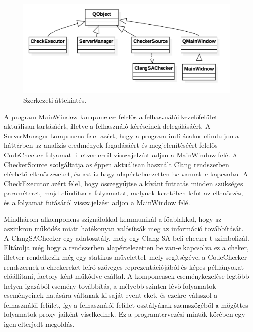\documentclass[a4paper,12pt]{report}
\begin{document}
\begin{figure}[h]
\caption{Szerkezeti áttekintés.}
\centering
\includegraphics[scale=0.3]{UMLattekintes.png}
\end{figure}

A program MainWindow komponense felelős a felhasználói kezelőfelület aktuálisan tartásáért, illetve a felhasználó kéréseinek delegálásáért. A ServerManager komponens felel azért, hogy a program indításakor elinduljon a háttérben az analízis-eredmények fogadásáért és megjelenítéséért felelős CodeChecker folyamat, illetver erről visszajelzést adjon a MainWindow felé. A CheckerSource szolgáltatja az éppen aktuálisan használt Clang rendszerben elérhető ellenőrzéseket, és azt is hogy alapértelmezetten be vannak-e kapcsolva. A CheckExecutor azért felel, hogy összegyűjtse a kívánt futtatás minden szükséges paraméterét, majd elindítsa a folyamatot, melynek keretében lefut az ellenőrzés, és a folyamat futásáról visszajelzést adjon a MainWindow felé.

Mindhárom alkomponens szignálokkal kommunikál a főablakkal, hogy az aszinkron működés miatt hatékonyan valósítsák meg az információ továbbítását. A ClangSAChecker egy adatosztály, mely egy Clang SA-beli checker-t szimbolizál. Eltárolja még hogy a rendszerben alapértelezetten be van-e kapcsolva ez a cheker, illetver rendelkezik még egy statikus művelettel, mely segítségével a  CodeChecker rendszernek a checkereket leíró szöveges reprezentációjából és képes példányokat előállítani, factory-ként működve ezáltal. A komponensek eseménykezelése legtöbb helyen igazából esemény továbbítás, a mélyebb szinten lévő folyamatok eseményeinek hatására váltanak ki saját event-eket, és ezekre válaszol a felhasználói felület, így a felhasználói felület osztályának szemszögéből a mögöttes folyamatok proxy-jaiként viselkednek. Ez a programtervezési minták körében egy igen elterjedt megoldás.
\end{document}
